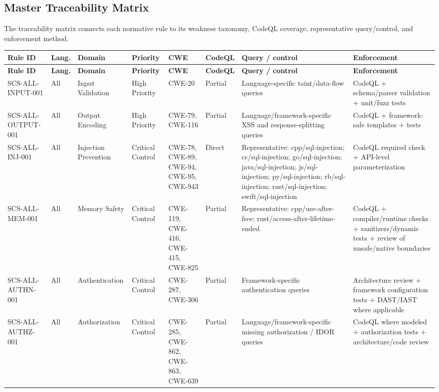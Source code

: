 \documentclass[10pt,letterpaper]{article}
\begin{document}
\begin{landscape}
\section{Master Traceability Matrix}
The traceability matrix connects each normative rule to its weakness taxonomy, CodeQL coverage, representative query/control, and enforcement method.

\tiny
\setlength{\tabcolsep}{2.5pt}
\begin{longtable}{@{}P{1.0in}P{0.6in}P{0.95in}P{0.75in}P{0.85in}P{0.75in}P{2.0in}P{2.05in}@{}}
\toprule
\textbf{Rule ID} & \textbf{Lang.} & \textbf{Domain} & \textbf{Priority} & \textbf{CWE} & \textbf{CodeQL} & \textbf{Query / control} & \textbf{Enforcement}\\
\midrule
\endfirsthead
\toprule
\textbf{Rule ID} & \textbf{Lang.} & \textbf{Domain} & \textbf{Priority} & \textbf{CWE} & \textbf{CodeQL} & \textbf{Query / control} & \textbf{Enforcement}\\
\midrule
\endhead
SCS-ALL-INPUT-001 & All & Input Validation & High Priority & CWE-20 & Partial & Language-specific taint/data-flow queries & CodeQL + schema/parser validation + unit/fuzz tests\\
SCS-ALL-OUTPUT-001 & All & Output Encoding & High Priority & CWE-79, CWE-116 & Partial & Language/framework-specific XSS and response-splitting queries & CodeQL + framework-safe templates + tests\\
SCS-ALL-INJ-001 & All & Injection Prevention & Critical Control & CWE-78, CWE-89, CWE-94, CWE-95, CWE-943 & Direct & Representative: cpp/sql-injection; cs/sql-injection; go/sql-injection; java/sql-injection; js/sql-injection; py/sql-injection; rb/sql-injection; rust/sql-injection; swift/sql-injection & CodeQL required check + API-level parameterization\\
SCS-ALL-MEM-001 & All & Memory Safety & Critical Control & CWE-119, CWE-416, CWE-415, CWE-825 & Partial & Representative: cpp/use-after-free; rust/access-after-lifetime-ended & CodeQL + compiler/runtime checks + sanitizers/dynamic tests + review of unsafe/native boundaries\\
SCS-ALL-AUTHN-001 & All & Authentication & Critical Control & CWE-287, CWE-306 & Partial & Framework-specific authentication queries & Architecture review + framework configuration tests + DAST/IAST where applicable\\
SCS-ALL-AUTHZ-001 & All & Authorization & Critical Control & CWE-285, CWE-862, CWE-863, CWE-639 & Partial & Language/framework-specific missing authorization / IDOR queries & CodeQL where modeled + authorization tests + architecture/code review\\

\end{longtable}
\end{landscape}
\end{document}
